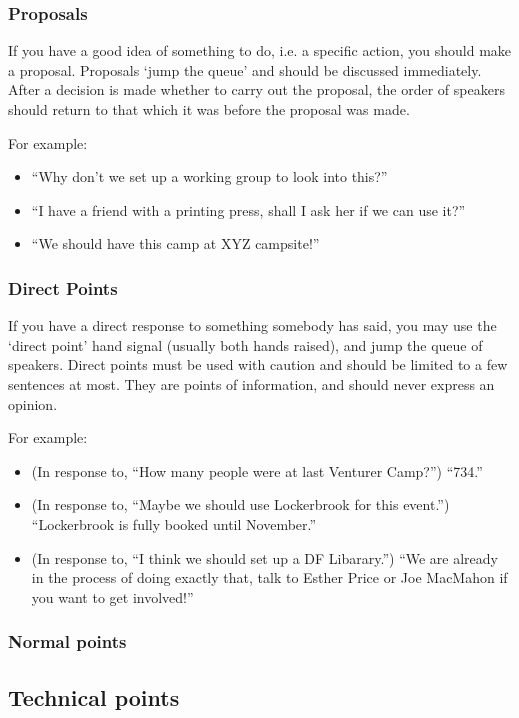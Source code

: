 \documentclass[a4paper, 12pt]{article} %
\begin{document}
\subsubsection{Proposals}
If you have a good idea of something to do, i.e. a specific action, you should make a proposal.  Proposals `jump the queue' and should be discussed immediately.  After a decision is made whether to carry out the proposal, the order of speakers should return to that which it was before the proposal was made.

For example:
\begin{itemize}
\item ``Why don't we set up a working group to look into this?''
\item ``I have a friend with a printing press, shall I ask her if we can use it?''
\item ``We should have this camp at XYZ campsite!''
\end{itemize}

\subsubsection{Direct Points}
If you have a direct response to something somebody has said, you may use the `direct point' hand signal (usually both hands raised), and jump the queue of speakers. Direct points must be used with caution and should be limited to a few sentences at most. They are points of information, and should never express an opinion.

For example:
\begin{itemize}
\item (In response to, ``How many people were at last Venturer Camp?'') ``734.''
\item (In response to, ``Maybe we should use Lockerbrook for this event.'') ``Lockerbrook is fully booked until November.''
\item (In response to, ``I think we should set up a DF Libarary.'') ``We are already in the process of doing exactly that, talk to Esther Price or Joe MacMahon if you want to get involved!''
\end{itemize}

\subsubsection{Normal points}

\subsection{Technical points}
\end{document}
